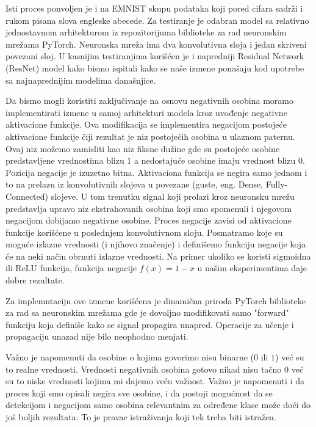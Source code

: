 Isti proces ponvoljen je i na EMNIST \cite{cohen2017emnist} skupu podataka koji pored cifara sadrži i rukom pisana slova engleske abecede. Za testiranje je odabran model sa relativno jednostavnom arhitekturom iz repozitorijuma biblioteke za rad neuronskim mrežama PyTorch. \cite{paszke2017pytorch} Neuronska mreža ima dva konvolutivna sloja i jedan skriveni povezani sloj. U kasnijim testiranjima korišćen je i napredniji Residual Network (ResNet) model kako bismo ispitali kako se naše izmene ponašaju kod upotrebe sa najnaprednijim modelima današnjice. 

Da bismo mogli koristiti zaključivanje na osnovu negativnih osobina moramo implementirati izmene u samoj arhitekturi modela kroz uvođenje negativne aktivacione funkcije. Ova modifikacija se implementira negacijom postojeće aktivacione funkcije čiji rezultat je niz postojećih osobina u ulaznom paternu. Ovaj niz možemo zamisliti kao niz fiksne dužine gde su postojeće osobine predstavljene vrednostima blizu $ 1 $ a nedostajuće osobine imaju vrednost blizu $ 0 $. Pozicija negacije je izuzetno bitna. Aktivaciona funkcija se negira samo jednom i to na prelazu iz konvolutivnih slojeva u povezane (guste, eng. Dense, Fully-Connected) slojeve. U tom trenutku signal koji prolazi kroz neuronsku mrežu predstavlja upravo niz ekstrahovanih osobina koji smo spomenuli i njegovom negacijom dobijamo negativne osobine. Proces negacije zavisi od aktivacione funkcije korišćene u poslednjem konvolutivnom sloju. Posmatramo koje su moguće izlazne vrednosti (i njihovo značenje) i definišemo funkciju negacije koja će na neki način obrnuti izlazne vrednosti. Na primer ukoliko se koristi sigmoidna ili ReLU funkcija, funkcija negacije \( f(x) = 1 - x \) u našim eksperimentima daje dobre rezultate.

Za implemntaciju ove izmene korišćena je dinamična priroda PyTorch biblioteke za rad sa neuronskim mrežama gde je dovoljno modifikovati samo "forward" funkciju koja definiše kako se signal propagira unapred. Operacije za učenje i propagaciju unazad nije bilo neophodno menjati.

Važno je napomenuti da osobine o kojima govorimo nisu binarne ($0$  ili $1$) već su to realne vrednosti. Vrednosti negativnih osobina gotovo nikad nisu tačno $0$ već su to niske vrednosti kojima mi dajemo veću važnost. Važno je napomenuti i da proces koji smo opisali negira sve osobine, i da postoji mogućnost da se detekcijom i negacijom samo osobina relevantnim za određene klase može doći do još boljih rezultata. To je pravac istraživanja koji tek treba biti istražen.

